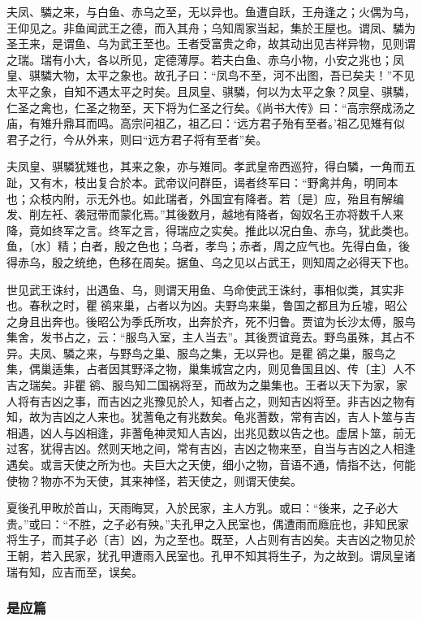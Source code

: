 \documentclass[]{article}
\begin{document}
夫凤、驎之来，与白鱼、赤乌之至，无以异也。鱼遭自跃，王舟逢之；火偶为乌，王仰见之。非鱼闻武王之德，而入其舟；乌知周家当起，集於王屋也。谓凤、驎为圣王来，是谓鱼、乌为武王至也。王者受富贵之命，故其动出见吉祥异物，见则谓之瑞。瑞有小大，各以所见，定德薄厚。若夫白鱼、赤乌小物，小安之兆也；凤皇、骐驎大物，太平之象也。故孔子曰：``凤鸟不至，河不出图，吾已矣夫！''不见太平之象，自知不遇太平之时矣。且凤皇、骐驎，何以为太平之象？凤皇、骐驎，仁圣之禽也，仁圣之物至，天下将为仁圣之行矣。《尚书大传》曰：``高宗祭成汤之庙，有雉升鼎耳而鸣。高宗问祖乙，祖乙曰：`远方君子殆有至者。'祖乙见雉有似君子之行，今从外来，则曰``远方君子将有至者''矣。

夫凤皇、骐驎犹雉也，其来之象，亦与雉同。孝武皇帝西巡狩，得白驎，一角而五趾，又有木，枝出复合於本。武帝议问群臣，谒者终军曰：``野禽并角，明同本也；众枝内附，示无外也。如此瑞者，外国宜有降者。若〔是〕应，殆且有解编发、削左衽、袭冠带而蒙化焉。''其後数月，越地有降者，匈奴名王亦将数千人来降，竟如终军之言。终军之言，得瑞应之实矣。推此以况白鱼、赤乌，犹此类也。鱼，〔水〕精；白者，殷之色也；乌者，孝鸟；赤者，周之应气也。先得白鱼，後得赤乌，殷之统绝，色移在周矣。据鱼、乌之见以占武王，则知周之必得天下也。

世见武王诛纣，出遇鱼、乌，则谓天用鱼、乌命使武王诛纣，事相似类，其实非也。春秋之时，瞿鹆来巢，占者以为凶。夫野鸟来巢，鲁国之都且为丘墟，昭公之身且出奔也。後昭公为季氏所攻，出奔於齐，死不归鲁。贾谊为长沙太傅，服鸟集舍，发书占之，云：``服鸟入室，主人当去''。其後贾谊竟去。野鸟虽殊，其占不异。夫凤、驎之来，与野鸟之巢、服鸟之集，无以异也。是瞿鹆之巢，服鸟之集，偶巢适集，占者因其野泽之物，巢集城宫之内，则见鲁国且凶、传〔主〕人不吉之瑞矣。非瞿鹆、服鸟知二国祸将至，而故为之巢集也。王者以天下为家，家人将有吉凶之事，而吉凶之兆豫见於人，知者占之，则知吉凶将至。非吉凶之物有知，故为吉凶之人来也。犹蓍龟之有兆数矣。龟兆蓍数，常有吉凶，吉人卜筮与吉相遇，凶人与凶相逢，非蓍龟神灵知人吉凶，出兆见数以告之也。虚居卜筮，前无过客，犹得吉凶。然则天地之间，常有吉凶，吉凶之物来至，自当与吉凶之人相逢遇矣。或言天使之所为也。夫巨大之天使，细小之物，音语不通，情指不达，何能使物？物亦不为天使，其来神怪，若天使之，则谓天使矣。

夏後孔甲畋於首山，天雨晦冥，入於民家，主人方乳。或曰：``後来，之子必大贵。''或曰：``不胜，之子必有殃。''夫孔甲之入民室也，偶遭雨而廕庇也，非知民家将生子，而其子必〔吉〕凶，为之至也。既至，人占则有吉凶矣。夫吉凶之物见於王朝，若入民家，犹孔甲遭雨入民室也。孔甲不知其将生子，为之故到。谓凤皇诸瑞有知，应吉而至，误矣。

\hypertarget{header-n752}{%
\subsubsection{是应篇}\label{header-n752}}
\end{document}

